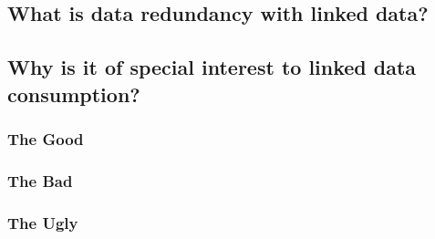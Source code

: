 \subsection{What is data redundancy with linked data?}

\subsection{Why is it of special interest to linked data consumption?}
\subsubsection{The Good}

\subsubsection{The Bad}

\subsubsection{The Ugly}
